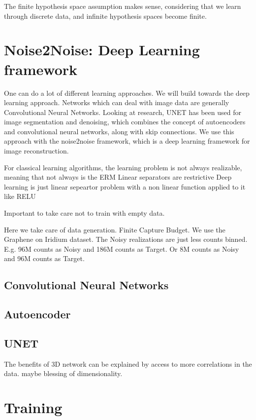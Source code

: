 The finite hypothesis space assumption makes sense, considering that we learn through discrete data, and infinite hypothesis spaces become finite. 


\section{Noise2Noise: Deep Learning framework}
One can do a lot of different learning approaches. We will build towards the deep learning approach. Networks which can deal with image data are generally Convolutional Neural Networks. Looking at research, UNET has been used for image segmentation and denoising, which combines the concept of autoencoders and convolutional neural networks, along with skip connections.
We use this approach with the noise2noise framework, which is a deep learning framework for image reconstruction.

For classical learning algorithms, the learning problem is not always realizable, meaning that not always is the 
ERM 
Linear separators are restrictive
Deep learning is just linear sepeartor problem with a non linear function applied to it like RELU



Important to take care not to train with empty data. \cite{lehtinenNoise2NoiseLearningImage2018}

Here we take care of data generation. Finite Capture Budget. We use the Graphene on Iridium dataset. The Noisy realizations are just less counts binned. 
E.g. 96M counts as Noisy and 186M counts as Target. Or 8M counts as Noisy and 96M counts as Target.
\subsection{Convolutional Neural Networks}
\subsection{Autoencoder}
\cite{goodfellowDeepLearning2016}
\subsection{UNET}


The benefits of 3D network can be explained by access to more correlations in the data. maybe blessing of dimensionality.

\section{Training}

